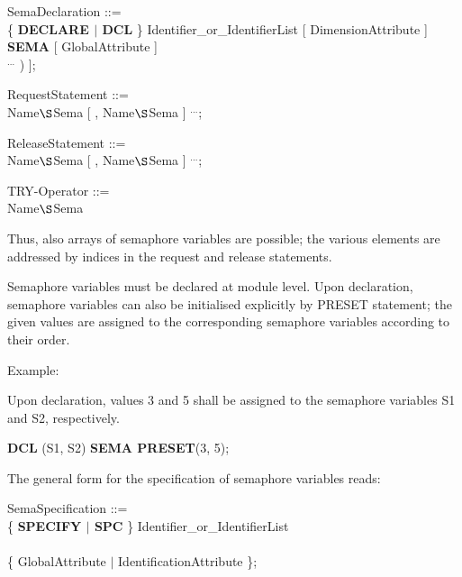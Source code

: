 SemaDeclaration ::= \\
\x \{ {\bf DECLARE $\mid$ DCL} \} Identifier\_or\_IdentifierList [ DimensionAttribute ] {\bf SEMA} [ GlobalAttribute ]\\
\x [ {\bf PRESET} (IntegerWithoutPrecision [ , IntegerWithoutPrecision ] $^{...}$ ) ];

RequestStatement ::=\\
 Name$\S $Sema [ , Name$\S $Sema ] $^{...}$;

ReleaseStatement ::=\\
 Name$\S $Sema [ , Name$\S $Sema ] $^{...}$;

TRY-Operator ::= \\
 Name$\S $Sema

Thus, also arrays of semaphore variables are possible; the various
elements are addressed by indices in the request and release
statements.

Semaphore variables must be declared at module level. Upon declaration,
semaphore variables can also be initialised explicitly by PRESET
statement; the given values are assigned to the corresponding
semaphore variables according to their order.

Example:

Upon declaration, values 3 and 5 shall be assigned to the semaphore
variables S1 and S2, respectively.

{\bf DCL} (S1, S2) {\bf SEMA PRESET}(3, 5);

The general form for the specification of semaphore variables reads:

SemaSpecification ::=\\
\x \{ {\bf SPECIFY $\mid$ SPC} \} Identifier\_or\_IdentifierList\\
\x {} \\
\x \x \{ GlobalAttribute $\mid$ IdentificationAttribute \};

